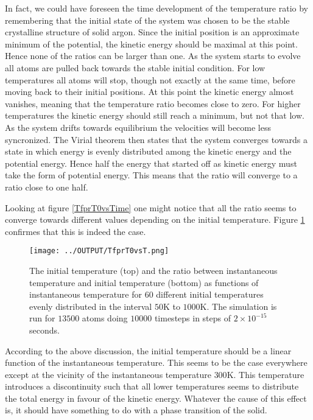 \documentclass[twoside,utf8]{article}
\begin{document}
\begin{multicols}{2}
\noindent
In fact, we could have foreseen the time development of the temperature ratio by remembering that the initial state of the system was chosen to be the stable crystalline structure of solid argon. Since the initial position is an approximate minimum of the potential, the kinetic energy should be maximal at this point. Hence none of the ratios can be larger than one. As the system starts to evolve all atoms are pulled back towards the stable initial condition. For low temperatures all atoms will stop, though not exactly at the same time, before moving back to their initial positions. At this point the kinetic energy almost vanishes, meaning that the temperature ratio becomes close to zero. For higher temperatures the kinetic energy should still reach a minimum, but not that low. As the system drifts towards equilibrium the velocities will become less syncronized. The Virial theorem then states that the system converges towards a state in which energy is evenly distributed among the kinetic energy and the potential energy. Hence half the energy that started off as kinetic energy must take the form of potential energy. This means that the ratio will converge to a ratio close to one half.  

Looking at figure \ref*{TfprT0vsTime} one might notice that all the ratio seems to converge towards different values depending on the initial temperature. Figure \ref*{TfprT0vsT} confirmes that this is indeed the case. 


\begin{figure}[H]
\begin{center}
\texttt{[image: ../OUTPUT/TfprT0vsT.png]}
\end{center}
\caption{
The initial temperature (top) and the ratio between instantaneous temperature and initial temperature (bottom) as functions of instantaneous temperature for 60 different initial temperatures evenly distributed in the interval $50$K to $1000$K. The simulation is run for $13500$ atoms doing $10000$ timesteps in steps of $2\times 10^{-15}$ seconds.
}
\label{TfprT0vsT}
\end{figure}

\noindent 
According to the above discussion, the initial temperature should be a linear function of the instantaneous temperature. This seems to be the case everywhere except at the vicinity of the instantaneous temperature $300$K. This temperature introduces a discontinuity such that all lower temperatures seems to distribute the total energy in favour of the kinetic energy. Whatever the cause of this effect is, it should have something to do with a phase transition of the solid. 
 


\end{multicols}
\end{document}
